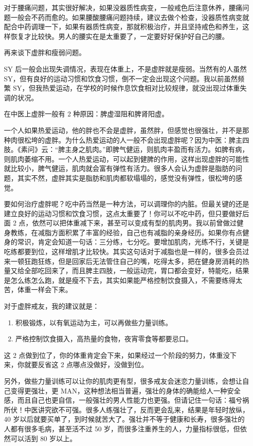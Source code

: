 \documentclass[fontset=founder]{ctexart}
\begin{document}
对于腰痛问题，其实很好解决，如果没器质性病变，一般戒色后注意休养，腰痛问题一般会不药而愈的。如果腰酸腰痛问题持续，建议去做个检查，没器质性病变就配合中药调理一下，如果有器质性病变，那就积极治疗，并且坚持戒色和养生，这样恢复才比较快。男人的腰实在是太重要了，一定要好好保护好自己的腰。

再来谈下虚胖和瘦弱问题。

SY 后一般会出现失调情况，表现在体重上，不是虚胖就是瘦弱。当然有的人虽然 SY，但有良好的运动习惯和饮食习惯，倒不一定会出现这个问题。我以前虽然频繁 SY，但我热爱运动，在学校的时候作息饮食相对比较规律，就没出现过体重失调的状况。

在中医上虚胖一般有 2 种原因：脾虚湿阻和脾肾阳虚。

一个人如果热爱运动，他的胖也不会是虚胖，虽然胖，但感觉也很强壮，并不是那种肉很松垮的虚胖。为什么热爱运动的人一般不会出现虚胖呢？因为中医：脾主四肢。《素问》云：“脾主身之肌肉。”即脾气健运，则肌肉丰盈而有活力。如脾有病，则肌肉萎缩不用。一个人热爱运动，可以起到健脾的作用，这样出现虚胖的可能性就比较小，脾气健运，肌肉就会富有弹性有活力。很多人会认为虚胖是脂肪的问题，其实不然，虚胖其实是脂肪和肌肉都软塌塌的，感觉没有弹性，很松垮的感觉。

要如何治疗虚胖呢？吃中药当然是一种方法，可以调理你的内脏。但最关键的还是建立良好的运动习惯和饮食习惯，这点太重要了！你可以不吃中药，但只要做好后面 2 点，依然可以把体重减下来，甚至可以变成有型的肌肉男。我以前曾做过健身教练，在减脂方面积累了丰富的经验，自己也有减脂的亲身经历。如果你有点健身的常识，肯定会知道一句话：三分练，七分吃。要增加肌肉，光练不行，关键是吃练都要到位，这样增肌才比较快。其实这句话对于减脂也是一样的，很多会员过来一顿狂跑狂练，但是回家后无法管住自己的嘴，吃得太多，把在健身房消耗的热量又给全部吃回来了，而且脾主四肢，一般运动完，胃口都会变好，特能吃，结果是怎么练怎么跑，就是瘦不下去，其实如果能严格控制饮食摄入，不需要练得太苦，体重一样会下来。

对于虚胖戒友，我的建议就是：

\begin{enumerate}
    \item 积极锻炼，以有氧运动为主，可以再做些力量训练。
    \item 严格控制饮食摄入，高热量的食物，夜宵零食等都要忌口。
\end{enumerate}

这 2 点做到位了，你的体重肯定会下来，如果经过一个阶段的努力，体重没下来，你就要反省这 2 点哪点没做好，没做到位。

另外，做些力量训练可以让你的肌肉更有型，很多戒友会迷恋力量训练，会想让自己变得更强壮，更 MAN，这种想法相当普遍，强壮的身体的确能给人一种安全感，而且自己也更自信，一般强壮的男人性能力也更强。但请记住一句话：福兮祸所伏！中医讲究欲不可强。很多人练强壮了，反而更会乱来，结果是年轻时放纵，40 岁以后就要买单了，到时候就苦大了。强壮并不等于健康和长寿，很多强壮的人都有很多毛病，甚至活不过 50 岁，而很多注重养生的人，力量指标很低，但依然可以活到 80 岁以上。
\end{document}
